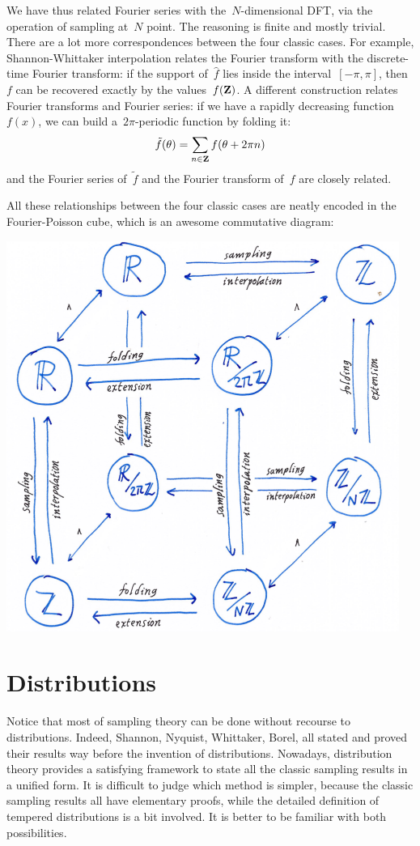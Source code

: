We have thus related Fourier series with the~$N$-dimensional DFT, via
the operation of sampling at~$N$ point.  The reasoning is finite and
mostly trivial.  There are a lot more correspondences between the
four classic cases.  For example, Shannon-Whittaker interpolation
relates the Fourier transform with the discrete-time Fourier
transform: if the support of~$\hat f$ lies inside the
interval~$[-\pi,\pi]$, then~$f$ can be recovered exactly by the
values~$f(\mathbf{Z})$.  A different construction relates Fourier transforms
and Fourier series: if we have a rapidly decreasing function~$f(x)$,
we can build a~$2\pi$-periodic function by folding it:
$$
\tilde f(\theta)=\sum_{n\in\mathbf{Z}} f(\theta+2\pi n)
$$
and the Fourier series of~$\tilde f$  and the Fourier transform
of~$f$ are closely related.

All these relationships between the four classic cases are neatly
encoded in the Fourier-Poisson cube, which is an awesome commutative
diagram:

\includegraphics{i/hfpcube.png}



\section{Distributions}

Notice that most of sampling theory can be done without recourse to
distributions.  Indeed, Shannon, Nyquist, Whittaker, Borel, all
stated and proved their results way before the invention of
distributions.  Nowadays, distribution theory provides a satisfying
framework to state all the classic sampling results in a unified
form.  It is difficult to judge which method is simpler, because the
classic sampling results all have elementary proofs, while the
detailed definition of tempered distributions is a bit involved.
It is better to be familiar with both possibilities.

